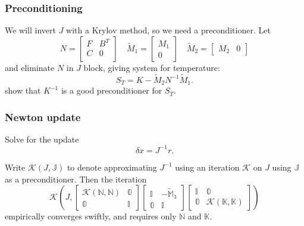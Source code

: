 \documentclass[presentation]{beamer}
\newcommand{\KSP}[2]{\ensuremath{\mathcal{K}\left(#1, \mathbb{#2}\right)}}
\newcommand{\ksp}[1]{\KSP{#1}{#1}}
\begin{document}
\begin{frame}
  \frametitle{Preconditioning}
  We will invert $J$ with a Krylov method, so we need a
  preconditioner.
  Let
  \begin{equation*}
    N = \begin{bmatrix}
      F & B^T\\
      C & 0 \\
    \end{bmatrix} \quad
    \tilde{M}_1 =
    \begin{bmatrix}
      M_1 \\
      0
    \end{bmatrix} \quad
    \tilde{M}_2 = \begin{bmatrix}
      M_2 & 0
    \end{bmatrix}
  \end{equation*}
  and eliminate $N$ in $J$ block, giving system for temperature:
  \begin{equation*}
    S_T = K - \tilde{M}_2 N^{-1} \tilde{M}_1.
  \end{equation*}
  \textcite{Howle:2012} show that $K^{-1}$ is a good preconditioner for
  $S_T$.
\end{frame}
\begin{frame}
  \frametitle{Newton update}
  Solve for the update
  \begin{equation*}
    \delta x = J^{-1} r.
  \end{equation*}

  Write $\mathcal{K}(J, \mathbb{J})$ to denote approximating $J^{-1}$
  using an iteration $\mathcal{K}$ on $J$ using $\mathbb{J}$ as a
  preconditioner.  Then the iteration
  \begin{equation*}
    \KSP{J}{\begin{bmatrix}
      \ksp{N} & 0 \\
      0 & I
    \end{bmatrix}
    \begin{bmatrix}
      I & -\tilde{M}_1 \\
      0 & I
    \end{bmatrix}
    \begin{bmatrix}
      I & 0\\
      0 & \ksp{K}
    \end{bmatrix}}
  \end{equation*}
  empirically converges swiftly, and
  requires only $\mathbb{N}$ and $\mathbb{K}$.
\end{frame}
\end{document}
